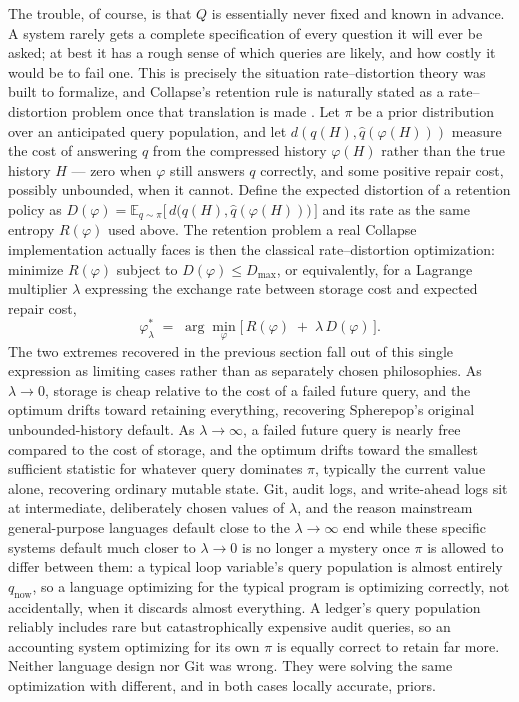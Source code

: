 \documentclass[11pt]{article}
\begin{document}
The trouble, of course, is that $Q$ is essentially never fixed and known in advance. A system rarely gets a complete specification of every question it will ever be asked; at best it has a rough sense of which queries are likely, and how costly it would be to fail one. This is precisely the situation rate--distortion theory was built to formalize, and Collapse's retention rule is naturally stated as a rate--distortion problem once that translation is made \cite{shannon1948, berger1971}. Let $\pi$ be a prior distribution over an anticipated query population, and let $d(q(H), \hat{q}(\varphi(H)))$ measure the cost of answering $q$ from the compressed history $\varphi(H)$ rather than the true history $H$ --- zero when $\varphi$ still answers $q$ correctly, and some positive repair cost, possibly unbounded, when it cannot. Define the expected distortion of a retention policy as $D(\varphi) = \mathbb{E}_{q \sim \pi}\big[\, d\big(q(H), \hat{q}(\varphi(H))\big) \,\big]$ and its rate as the same entropy $R(\varphi)$ used above. The retention problem a real Collapse implementation actually faces is then the classical rate--distortion optimization: minimize $R(\varphi)$ subject to $D(\varphi) \leq D_{\max}$, or equivalently, for a Lagrange multiplier $\lambda$ expressing the exchange rate between storage cost and expected repair cost,
\[
\varphi_\lambda^{*} \;=\; \arg\min_{\varphi} \Big[\, R(\varphi) \;+\; \lambda\, D(\varphi) \,\Big].
\]
The two extremes recovered in the previous section fall out of this single expression as limiting cases rather than as separately chosen philosophies. As $\lambda \to 0$, storage is cheap relative to the cost of a failed future query, and the optimum drifts toward retaining everything, recovering Spherepop's original unbounded-history default. As $\lambda \to \infty$, a failed future query is nearly free compared to the cost of storage, and the optimum drifts toward the smallest sufficient statistic for whatever query dominates $\pi$, typically the current value alone, recovering ordinary mutable state. Git, audit logs, and write-ahead logs sit at intermediate, deliberately chosen values of $\lambda$, and the reason mainstream general-purpose languages default close to the $\lambda \to \infty$ end while these specific systems default much closer to $\lambda \to 0$ is no longer a mystery once $\pi$ is allowed to differ between them: a typical loop variable's query population is almost entirely $q_{\mathrm{now}}$, so a language optimizing for the typical program is optimizing correctly, not accidentally, when it discards almost everything. A ledger's query population reliably includes rare but catastrophically expensive audit queries, so an accounting system optimizing for its own $\pi$ is equally correct to retain far more. Neither language design nor Git was wrong. They were solving the same optimization with different, and in both cases locally accurate, priors.
\end{document}
